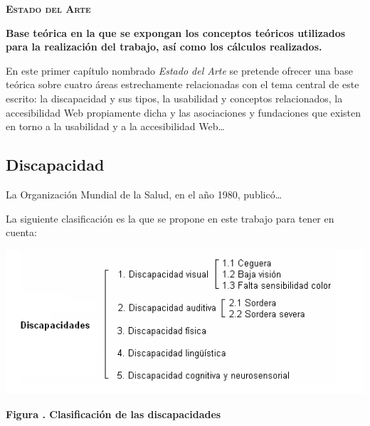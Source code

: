 \documentclass[a4paper]{article}
\newcommand\textstyleProyectoCursiva[1]{\textit{#1}}
\newcounter{Figura}
\renewcommand\theFigura{\arabic{Figura}}
\begin{document}
\clearpage\setcounter{page}{1}\pagestyle{Convertirvi}
{\raggedleft\bfseries\scshape
Estado del Arte
\par}

\clearpage
\bigskip

\clearpage\setcounter{page}{1}\pagestyle{Convertirvii}

\bigskip


\bigskip


\bigskip


\bigskip

{\bfseries
Base teórica en la que se expongan los conceptos teóricos utilizados para la realización del trabajo, así como los cálculos realizados.}


\bigskip

{
{En este }{primer }{capítulo nombrado }\textstyleProyectoCursiva{{Estado del Arte}}{ se pretende ofrecer una base teórica sobre }{cuatro}{ áreas estrechamente relacionadas con el tema central de este escrito: }{la discapacidad y sus tipos, }{la usabilidad y conceptos relacionados, la accesibilidad Web propiamente dicha y las asociaciones y fundaciones que existen en torno a la usabilidad y a la accesibilidad Web…}}


\bigskip

\subsection{Discapacidad}
{
{La Organización Mundial de la Salud, en el año 1980, publicó}{…}}

{
La siguiente clasificación es la que se propone en este trabajo para tener en cuenta:}

{\centering  \includegraphics{TFCPlantilla-img/TFCPlantilla-img2.png} \par}

{\centering\bfseries
{Figura }{\stepcounter{Figura}{\theFigura}}{. Clasificación de las discapacidades}
\par}
\end{document}
